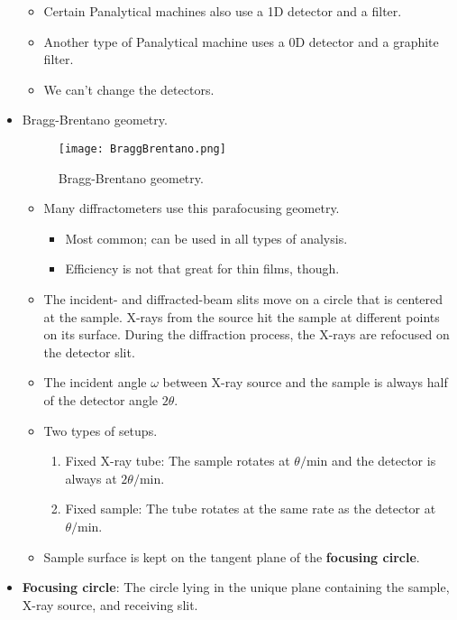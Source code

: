 \documentclass[../notes.tex]{subfiles}
\begin{document}
\begin{itemize}
\begin{itemize}
        \item Certain Panalytical machines also use a 1D detector and a  filter.
        \item Another type of Panalytical machine uses a 0D detector and a graphite filter.
        \item We can't change the detectors.
    \end{itemize}
    \item Bragg-Brentano geometry.
    \begin{figure}[H]
        \centering
        \texttt{[image: BraggBrentano.png]}
        \caption{Bragg-Brentano geometry.}
        \label{fig:BraggBrentano}
    \end{figure}
    \begin{itemize}
        \item Many diffractometers use this parafocusing geometry.
        \begin{itemize}
            \item Most common; can be used in all types of analysis.
            \item Efficiency is not that great for thin films, though.
        \end{itemize}
        \item The incident- and diffracted-beam slits move on a circle that is centered at the sample. X-rays from the source hit the sample at different points on its surface. During the diffraction process, the X-rays are refocused on the detector slit.
        \item The incident angle $\omega$ between X-ray source and the sample is always half of the detector angle $2\theta$.
        \item Two types of setups.
        \begin{enumerate}
            \item Fixed X-ray tube: The sample rotates at $\theta/\text{min}$ and the detector is always at $2\theta/\text{min}$.
            \item Fixed sample: The tube rotates at the same rate as the detector at $\theta/\text{min}$.
        \end{enumerate}
        \item Sample surface is kept on the tangent plane of the \textbf{focusing circle}.
    \end{itemize}
    \item \textbf{Focusing circle}: The circle lying in the unique plane containing the sample, X-ray source, and receiving slit.

\end{itemize}
\end{document}
